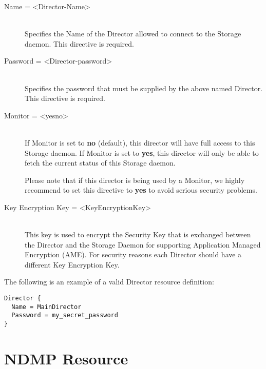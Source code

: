 \begin{description}

\item [Name = {\textless}Director-Name{\textgreater}] \hfill \\
Specifies the Name of the Director allowed to connect  to the Storage daemon.
This directive is required.

\item [Password = {\textless}Director-password{\textgreater}] \hfill \\
Specifies the password that must be supplied by the above named  Director.
This directive is required.

\item [Monitor = {\textless}yes{\textbar}no{\textgreater}] \hfill \\
If Monitor is set to {\bf no} (default), this director will have full
access to this Storage daemon.  If Monitor is set to {\bf yes}, this
director will only be able to fetch the current status of this Storage
daemon.

Please note that if this director is being used by a Monitor, we highly
recommend to set this directive to {\bf yes} to avoid serious security
problems.

\item [Key Encryption Key = {\textless}KeyEncryptionKey{\textgreater}] \hfill \\
This key is used to encrypt the Security Key that is exchanged between
the Director and the Storage Daemon for supporting Application Managed
Encryption (AME). For security reasons each Director should have a
different Key Encryption Key.

\end{description}

The following is an example of a valid Director resource definition:

\footnotesize
\begin{verbatim}
Director {
  Name = MainDirector
  Password = my_secret_password
}
\end{verbatim}
\normalsize

\section{NDMP Resource}
\label{NDMPResource}

